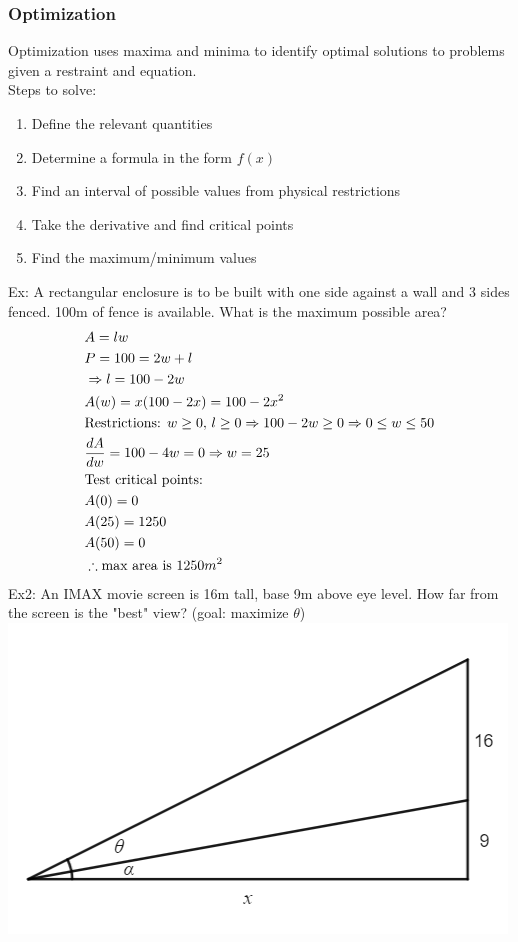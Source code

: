 \documentclass[11pt, fleqn]{article}
\begin{document}
\subsubsection{Optimization}
Optimization uses maxima and minima to identify optimal solutions to problems given a restraint and equation.\\
Steps to solve:
\begin{enumerate}
    \item Define the relevant quantities
    \item Determine a formula in the form $f(x)$
    \item Find an interval of possible values from physical restrictions
    \item Take the derivative and find critical points
    \item Find the maximum/minimum values
\end{enumerate}
Ex: A rectangular enclosure is to be built with one side against a wall and 3 sides fenced. 100m of fence is available. What is the maximum possible area?
\begin{align*}
    &A=lw\\
    &P=100=2w+l\\
    &\Rightarrow l=100-2w\\
    &A(w)=x(100-2x)=100-2x^2\\
    &\text{Restrictions: }w\geq 0,\, l\geq 0\Rightarrow 100-2w\geq 0\Rightarrow 0\leq w\leq 50\\
    &\frac{dA}{dw}=100-4w=0\Rightarrow w=25\\
    &\text{Test critical points: }\\
    &A(0)=0\\
    &A(25)=1250\\
    &A(50)=0\\
    &\therefore \text{max area is }1250m^2
\end{align*}
Ex2: An IMAX movie screen is 16m tall, base 9m above eye level. How far from the screen is the "best" view? (goal: maximize $\theta$)\\
\includegraphics[scale=0.8]{DifferentialCalculusPictures/OptimizationEx.png}
\end{document}
